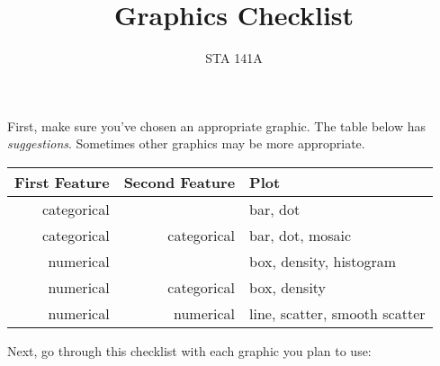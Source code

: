 \documentclass{article}
\title{Graphics Checklist}
\author{STA 141A}
\date{}
\begin{document}
\maketitle{}

First, make sure you've chosen an appropriate graphic. The table below has
\textit{suggestions}. Sometimes other graphics may be more appropriate.

\begin{table}[h!]
\centering
\begin{tabular}{rrl}
First Feature & Second Feature & Plot                          \\
\midrule
categorical   &                & bar, dot                      \\
categorical   & categorical    & bar, dot, mosaic              \\
numerical     &                & box, density, histogram       \\
numerical     & categorical    & box, density                  \\
numerical     & numerical      & line, scatter, smooth scatter \\
\end{tabular}
\end{table}

Next, go through this checklist with each graphic you plan to use:
\end{document}

